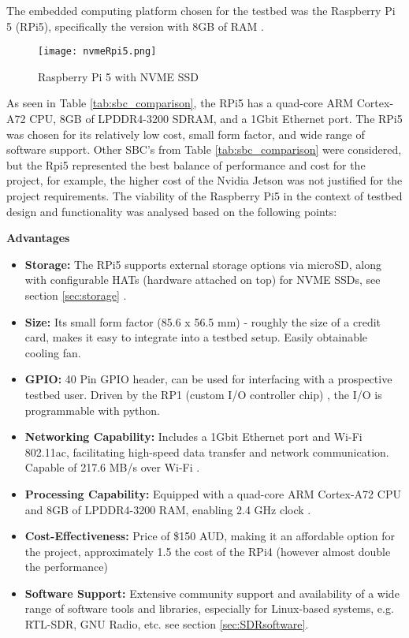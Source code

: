 The embedded computing platform chosen for the testbed was the Raspberry Pi 5 (RPi5), specifically the version with 8GB of RAM \cite{core_electronics_rpi5}. 

\begin{figure}[htbp]
    \centering
    \texttt{[image: nvmeRpi5.png]}
    \caption{Raspberry Pi 5 with NVME SSD \cite{pimoroni_nvme_base}}
    \label{fig:Rpi5}
\end{figure}

As seen in Table \ref{tab:sbc_comparison}, the RPi5 has a quad-core ARM Cortex-A72 CPU, 8GB of LPDDR4-3200 SDRAM, and a 1Gbit Ethernet port. The RPi5 was chosen for its relatively low cost, small form factor, and wide range of software support. Other SBC's from Table \ref{tab:sbc_comparison} were considered, but the Rpi5 represented the best balance of performance and cost for the project, for example, the higher cost of the Nvidia Jetson was not justified for the project requirements. The viability of the Raspberry Pi5 in the context of testbed design and functionality was analysed based on the following points:

\noindent \textbf{Advantages}
\begin{itemize}
    \item \textbf{Storage:} The RPi5 supports external storage options via microSD, along with configurable HATs (hardware attached on top) for NVME SSDs, see section \ref{sec:storage} \cite{pimoroni_nvme_base}.
    \item \textbf{Size:} Its small form factor (85.6 x 56.5 mm) - roughly the size of a credit card, makes it easy to integrate into a testbed setup. Easily obtainable cooling fan.
    \item \textbf{GPIO:} 40 Pin GPIO header, can be used for interfacing with a prospective testbed user. Driven by the RP1 (custom I/O controller chip) \cite{core_electronics_rpi5}, the I/O is programmable with python.
    \item \textbf{Networking Capability:} Includes a 1Gbit Ethernet port and Wi-Fi 802.11ac, facilitating high-speed data transfer and network communication. Capable of 217.6 MB/s over Wi-Fi \cite{rpi5_wifi}.
    \item \textbf{Processing Capability:} Equipped with a quad-core ARM Cortex-A72 CPU and 8GB of LPDDR4-3200 RAM, enabling 2.4 GHz clock \cite{core_electronics_rpi5}.
    \item \textbf{Cost-Effectiveness:} Price of \$150 AUD, making it an affordable option for the project, approximately 1.5 the cost of the RPi4 (however almost double the performance) \cite{core_electronics_rpi5}
    \item \textbf{Software Support:} Extensive community support and availability of a wide range of software tools and libraries, especially for Linux-based systems, e.g. RTL-SDR, GNU Radio, etc. see section \ref{sec:SDRsoftware}.
\end{itemize}

